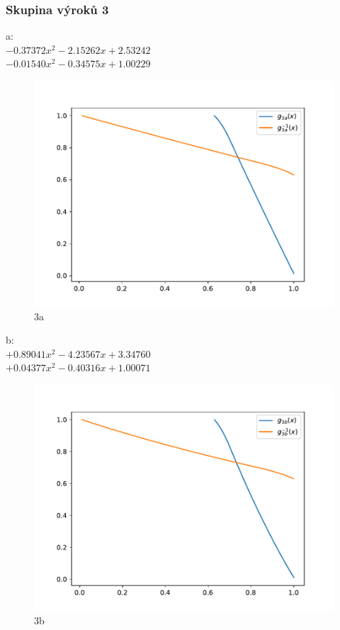 \subsubsection{Skupina výrok\r u 3}
a:\\
$-0.37372x^2-2.15262x+2.53242$\\
$-0.01540x^2-0.34575x+1.00229$\\
\begin{figure}[H]
    \caption{3a}
        \hspace{-1cm}
        \includegraphics[scale=0.5]{template-fig/p4.pdf}
        \centering
\end{figure}
b:\\
$+0.89041x^2-4.23567x+3.34760$\\
$+0.04377x^2-0.40316x+1.00071$\\
\begin{figure}[H]
    \caption{3b}
        \hspace{-1cm}
        \includegraphics[scale=0.5]{template-fig/p5.pdf}
        \centering
\end{figure}
